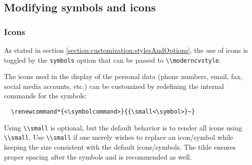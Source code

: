 \documentclass[a4paper, 11pt]{article}
\newcommand{\code}[1]{\lstinline!#1!}
\begin{document}
\subsection{Modifying symbols and icons}
\subsubsection{Icons}
As stated in section \ref{section:customization:stylesAndOptions}, the use of icons is toggled by the \code{symbols} option that can be passed to \code{\\moderncvstyle}.

The icons used in the display of the personal data (phone numbers, email, fax, social media accounts, etc.) can be customized by redefining the internal commands for the symbols:
\begin{lstlisting}
  \renewcommand*{<\symbolcommand>}{{\small<\symbol>}~}
\end{lstlisting}
Using \code{\\small} is optional, but the default behavior is to render all icons using \code{\\small}.
Use \code{\\small} if one merely wishes to replace an icon/symbol while keeping the size consistent with the default icons/symbols.
The tilde ensures proper spacing after the symbols and is recommended as well.
\end{document}
